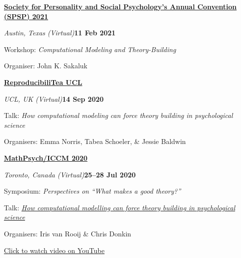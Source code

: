 \documentclass[10pt]{article}
\newenvironment{outerlist}[1][\enskip\textbullet]%
        {\begin{itemize}[#1]}{\end{itemize}%
         \vspace{-.6\baselineskip}}
\newenvironment{innerlist}[1][\enskip\textbullet]%
        {\begin{compactitem}[#1]}{\end{compactitem}}
\begin{document}
\textbf{\href{https://www.inria.fr/en/centre-bordeaux-sud-ouest}{Society for Personality and Social Psychology’s Annual Convention (SPSP) 2021}} 
\begin{outerlist}
  \item[] \textit{Austin, Texas (Virtual)}\hfill\textbf{11 Feb 2021}
  \begin{innerlist}
    \item Workshop: \textit{Computational Modeling and Theory-Building}
    \item Organiser: John K. Sakaluk
  \end{innerlist}
\end{outerlist}
\vspace{8pt}


\textbf{\href{https://www.eventbrite.co.uk/o/reproducibilitea-ucl-19116673509}{ReproducibiliTea UCL}} 
\begin{outerlist}
  \item[] \textit{UCL, UK (Virtual)}\hfill\textbf{14 Sep 2020}
  \begin{innerlist}
    \item Talk: \textit{How computational modeling can force theory building in psychological science}
    \item Organisers: Emma Norris, Tabea Schoeler, \&  Jessie Baldwin
  \end{innerlist}
\end{outerlist}
\vspace{8pt}

\textbf{\href{http://mathpsych.org/conferences/2020/}{MathPsych/ICCM 2020}} 
\begin{outerlist}
  \item[] \textit{Toronto, Canada (Virtual)}\hfill\textbf{25--28 Jul 2020}
  \begin{innerlist}
    \item Symposium: \textit{Perspectives on ``What makes a good theory?''}
    \item Talk:  \href{https://youtu.be/8Aa9_6ahO48}{\textit{How computational modelling can force theory building in psychological science}}
    \item Organisers: Iris van Rooij \& Chris Donkin 
    \item  \href{https://youtu.be/8Aa9_6ahO48}{Click to watch video on YouTube}
  \end{innerlist}
\end{outerlist}
\vspace{8pt}
\end{document}
